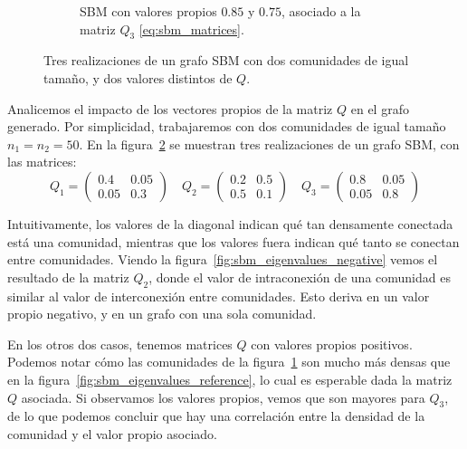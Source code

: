 \documentclass{article}
\begin{document}
\begin{figure}[htb]
\begin{subfigure}{0.49\textwidth}
        \caption{SBM con valores propios $0.85$ y $0.75$, asociado a la matriz $Q_3$ \eqref{eq:sbm_matrices}.}
        \label{fig:sbm_eigenvalues_big}
    \end{subfigure}
    \caption{Tres realizaciones de un grafo SBM con dos comunidades de igual tamaño, y dos valores distintos de $Q$.}
    \label{fig:sbm_eigenvalues}
\end{figure}

Analicemos el impacto de los vectores propios de la matriz $Q$ en el grafo generado. Por simplicidad, trabajaremos con dos comunidades de igual tamaño $n_1=n_2=50$.
En la figura~\ref{fig:sbm_eigenvalues} se muestran tres realizaciones de un grafo SBM, con las matrices:
\begin{equation}
    \label{eq:sbm_matrices}
    Q_1 = \left( \begin{matrix}
        0.4 & 0.05 \\
        0.05 & 0.3
    \end{matrix} \right) \quad
    Q_2 = \left( \begin{matrix}
        0.2 & 0.5 \\
        0.5 & 0.1
    \end{matrix} \right) \quad
    Q_3 = \left( \begin{matrix}
        0.8 & 0.05 \\
        0.05 & 0.8
    \end{matrix} \right)
\end{equation}

Intuitivamente, los valores de la diagonal indican qué tan densamente conectada está una comunidad, mientras que los valores fuera indican qué tanto se conectan
entre comunidades. Viendo la figura~\ref{fig:sbm_eigenvalues_negative} vemos el resultado de la matriz $Q_2$, donde el valor de intraconexión de una comunidad es 
similar al valor de interconexión entre comunidades. Esto deriva en un valor propio negativo, y en un grafo con una sola comunidad.

En los otros dos casos, tenemos matrices $Q$ con valores propios positivos. Podemos notar cómo las comunidades de la figura~\ref{fig:sbm_eigenvalues_big} son mucho más 
densas que en la figura~\ref{fig:sbm_eigenvalues_reference}, lo cual es esperable dada la matriz $Q$ asociada. Si observamos los valores propios, vemos que son 
mayores para $Q_3$, de lo que podemos concluir que hay una correlación entre la densidad de la comunidad y el valor propio asociado.
\end{document}
